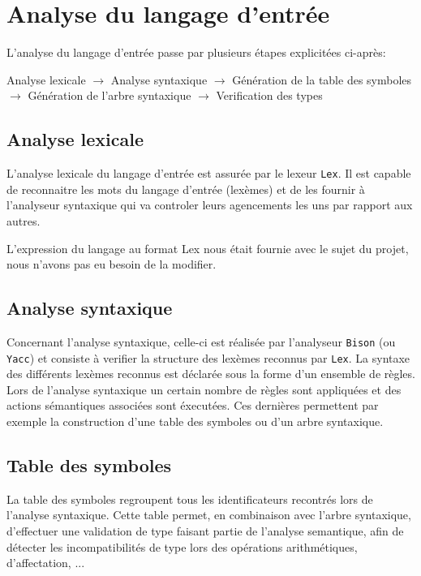 \newpage
\section{Analyse du langage d'entrée}

L'analyse du langage d'entrée passe par plusieurs étapes explicitées ci-après:

Analyse lexicale $\rightarrow$ Analyse syntaxique $\rightarrow$ Génération de la table des symboles $\rightarrow$ Génération de l'arbre syntaxique $\rightarrow$ Verification des types

\subsection{Analyse lexicale}

L'analyse lexicale du langage d'entrée est assurée par le lexeur \verb?Lex?. Il est capable de reconnaitre les mots du langage d'entrée (lexèmes) et de les fournir à l'analyseur syntaxique qui va controler leurs agencements les uns par rapport aux autres.

L'expression du langage au format Lex nous était fournie avec le sujet du projet, nous n'avons pas eu besoin de la modifier.


\subsection{Analyse syntaxique}

Concernant l'analyse syntaxique, celle-ci est réalisée par l'analyseur \verb?Bison? (ou \verb?Yacc?) et consiste à verifier la structure des lexèmes reconnus par \verb?Lex?.
La syntaxe des différents lexèmes reconnus est déclarée sous la forme d'un ensemble de règles. Lors de l'analyse syntaxique un certain nombre de règles sont appliquées et des actions sémantiques associées sont éxecutées. Ces dernières permettent par exemple la construction d'une table des symboles ou d'un arbre syntaxique.

\subsection{Table des symboles}

La table des symboles regroupent tous les identificateurs recontrés lors de l'analyse syntaxique. 
Cette table permet, en combinaison avec l'arbre syntaxique, d'effectuer une validation de type faisant partie de l'analyse semantique, afin de détecter les incompatibilités de type lors des opérations arithmétiques, d'affectation, ...\\ 

